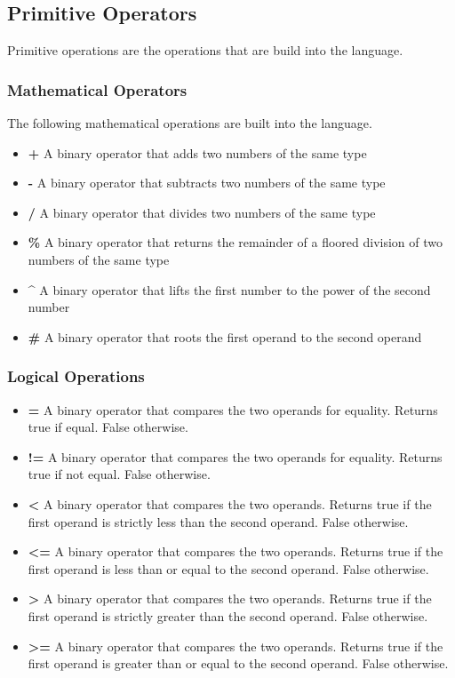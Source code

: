 \subsection{Primitive Operators}
\label{subsec:primitiveOps}

Primitive operations are the operations that are build into the language.

\subsubsection{Mathematical Operators}
\label{sec:mathOps}

The following mathematical operations are built into the language.

\begin{itemize}
  \item \textbf{+} A binary operator that adds two numbers of the same type
  \item \textbf{-} A binary operator that subtracts two numbers of the same type
  \item \textbf{/} A binary operator that divides two numbers of the same type
  \item \textbf{\%} A binary operator that returns the remainder of a floored division of two numbers of the same type
  \item \textbf{\^}  A binary operator that lifts the first number to the power of the second number
  \item \textbf{\#} A binary operator that roots the first operand to the second operand
\end{itemize}


\subsubsection{Logical Operations}
\label{sec:logicOps}

\begin{itemize}
  \item \textbf{=} A binary operator that compares the two operands for equality. Returns true if equal. False otherwise.
  \item \textbf{!=} A binary operator that compares the two operands for equality. Returns true if not equal. False otherwise.
  \item \textbf{<} A binary operator that compares the two operands. Returns true if the first operand is strictly less than the second operand. False otherwise.
  \item \textbf{<=} A binary operator that compares the two operands. Returns true if the first operand is less than or equal to the second operand. False otherwise.
  \item \textbf{>} A binary operator that compares the two operands. Returns true if the first operand is strictly greater than the second operand. False otherwise.
  \item \textbf{>=} A binary operator that compares the two operands. Returns true if the first operand is greater than or equal to the second operand. False otherwise.
\end{itemize}

